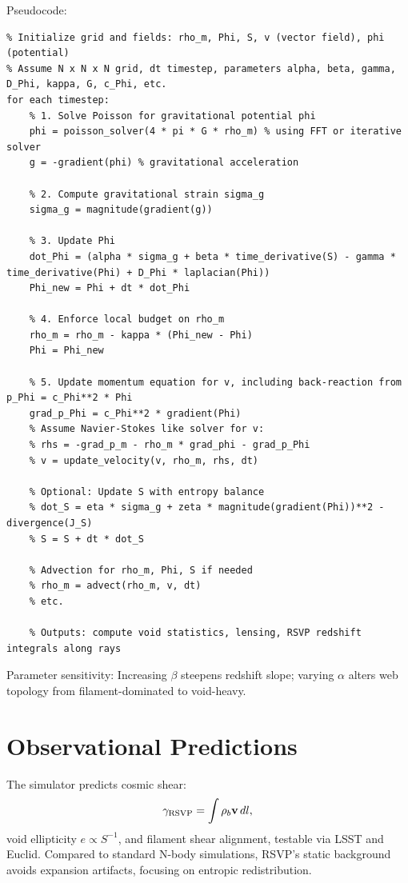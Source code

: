 \documentclass[12pt, a4paper, openany]{book}
\theoremstyle{definition}
\begin{document}
Pseudocode:
\begin{lstlisting}
% Initialize grid and fields: rho_m, Phi, S, v (vector field), phi (potential)
% Assume N x N x N grid, dt timestep, parameters alpha, beta, gamma, D_Phi, kappa, G, c_Phi, etc.
for each timestep:
    % 1. Solve Poisson for gravitational potential phi
    phi = poisson_solver(4 * pi * G * rho_m) % using FFT or iterative solver
    g = -gradient(phi) % gravitational acceleration

    % 2. Compute gravitational strain sigma_g
    sigma_g = magnitude(gradient(g))

    % 3. Update Phi
    dot_Phi = (alpha * sigma_g + beta * time_derivative(S) - gamma * time_derivative(Phi) + D_Phi * laplacian(Phi))
    Phi_new = Phi + dt * dot_Phi

    % 4. Enforce local budget on rho_m
    rho_m = rho_m - kappa * (Phi_new - Phi)
    Phi = Phi_new

    % 5. Update momentum equation for v, including back-reaction from p_Phi = c_Phi**2 * Phi
    grad_p_Phi = c_Phi**2 * gradient(Phi)
    % Assume Navier-Stokes like solver for v:
    % rhs = -grad_p_m - rho_m * grad_phi - grad_p_Phi
    % v = update_velocity(v, rho_m, rhs, dt)

    % Optional: Update S with entropy balance
    % dot_S = eta * sigma_g + zeta * magnitude(gradient(Phi))**2 - divergence(J_S)
    % S = S + dt * dot_S

    % Advection for rho_m, Phi, S if needed
    % rho_m = advect(rho_m, v, dt)
    % etc.

    % Outputs: compute void statistics, lensing, RSVP redshift integrals along rays
\end{lstlisting}

Parameter sensitivity: Increasing $\beta$ steepens redshift slope; varying $\alpha$ alters web topology from filament-dominated to void-heavy.

\section{Observational Predictions}
The simulator predicts cosmic shear:
\begin{equation}
\gamma_{\rm RSVP} = \int \rho_b \mathbf{v} \, dl,
\end{equation}
void ellipticity $e \propto S^{-1}$, and filament shear alignment, testable via LSST and Euclid. Compared to standard N-body simulations, RSVP's static background avoids expansion artifacts, focusing on entropic redistribution.
\end{document}
